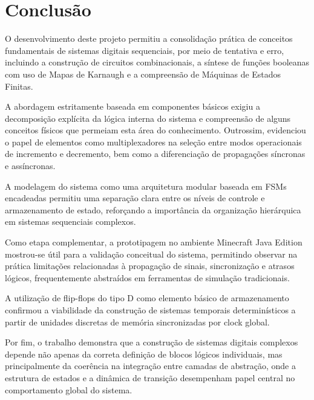 \section{Conclusão}

O desenvolvimento deste projeto permitiu a consolidação prática de conceitos fundamentais de sistemas digitais sequenciais, por meio de tentativa e erro, incluindo a construção de circuitos combinacionais, a síntese de funções booleanas com uso de Mapas de Karnaugh e a compreensão de Máquinas de Estados Finitas.

A abordagem estritamente baseada em componentes básicos exigiu a decomposição explícita da lógica interna do sistema e compreensão de alguns conceitos físicos que permeiam esta área do conhecimento. Outrossim, evidenciou o papel de elementos como multiplexadores na seleção entre modos operacionais de incremento e decremento, bem como a diferenciação de propagações síncronas e assíncronas.

A modelagem do sistema como uma arquitetura modular baseada em FSMs encadeadas permitiu uma separação clara entre os níveis de controle e armazenamento de estado, reforçando a importância da organização hierárquica em sistemas sequenciais complexos.

Como etapa complementar, a prototipagem no ambiente Minecraft Java Edition mostrou-se útil para a validação conceitual do sistema, permitindo observar na prática limitações relacionadas à propagação de sinais, sincronização e atrasos lógicos, frequentemente abstraídos em ferramentas de simulação tradicionais.

A utilização de flip-flops do tipo D como elemento básico de armazenamento confirmou a viabilidade da construção de sistemas temporais determinísticos a partir de unidades discretas de memória sincronizadas por clock global.

Por fim, o trabalho demonstra que a construção de sistemas digitais complexos depende não apenas da correta definição de blocos lógicos individuais, mas principalmente da coerência na integração entre camadas de abstração, onde a estrutura de estados e a dinâmica de transição desempenham papel central no comportamento global do sistema.